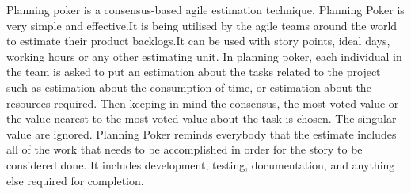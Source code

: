 Planning poker is a consensus-based agile estimation technique. Planning Poker is very simple and effective.It is being utilised by the agile teams around the world to estimate their product backlogs.It can be used with story points, ideal days, working hours or any other estimating unit.
In planning poker, each individual in the team is asked to put an estimation about the tasks related to the project such as estimation about the consumption of time, or estimation about the resources required. Then keeping in mind the consensus, the most voted value or the value nearest to the most voted value about the task is chosen. The singular value are ignored.
Planning Poker reminds everybody that the estimate includes all of the work that needs to be accomplished in order for the story to be considered done. It includes development, testing, documentation, and anything else required for completion.
